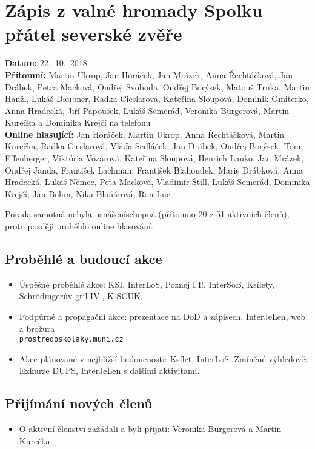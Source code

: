 \documentclass[11pt,a4paper]{article}
\begin{document}
\section*{Zápis z valné hromady Spolku přátel severské zvěře}
\textbf{Datum:} 22.~10.~2018\\
\textbf{Přítomní:} Martin Ukrop, Jan Horáček, Jan Mrázek, Anna Řechtáčková, Jan Drábek, Petra Macková, Ondřej Svoboda, Ondřej Borýsek, Matouš Trnka, Martin Hanžl, Lukáš Daubner, Radka Cieslarová, Kateřina Sloupová, Dominik Gmiterko, Anna Hradecká, Jiří Papoušek, Lukáš Semerád, Veronika Burgerová, Martin Kurečka a Dominika Krejčí na telefonu\\
\textbf{Online hlasující:} Jan Horáček, Martin Ukrop, Anna Řechtáčková, Martin Kurečka, Radka Cieslarová, Vláďa Sedláček, Jan Drábek, Ondřej Borýsek, Tom Effenberger, Viktória Vozárová, Kateřina Sloupová, Henrich Lauko, Jan Mrázek, Ondřej Janda, František Lachman, František Blahoudek, Marie Drábková, Anna Hradecká, Lukáš Němec, Peťa Macková, Vladimír Štill, Lukáš Semerád, Dominika Krejčí, Jan Böhm, Nika Blaňárová, Ron Luc

\vspace{1em}

\noindent Porada samotná nebyla usnášeníschopná (přítomno 20 z 51 aktivních členů), proto později proběhlo online hlasování.

\subsection*{Proběhlé a budoucí akce}
\begin{itemize}[itemsep=0pt]
\item Úspěšně proběhlé akce: KSI, InterLoS, Poznej FI!, InterSoB, Ksílety, Schrödingerův gril IV., K-SCUK.
\item Podpůrné a propagační akce: prezentace na DoD a zápisech, InterJeLen, web a brožura\\ \texttt{prostredoskolaky.muni.cz}
\item Akce plánované v nejbližší budoucnosti: Ksílet, InterLoS. Zmíněné výhledově: Exkurze DUPS, InterJeLen s dalšími aktivitami.
\end{itemize}

\subsection*{Přijímání nových členů}
\begin{itemize}[itemsep=0pt]
\item O aktivní členství zažádali a byli přijati: Veronika Burgerová a Martin Kurečka.
\end{itemize}
\end{document}
